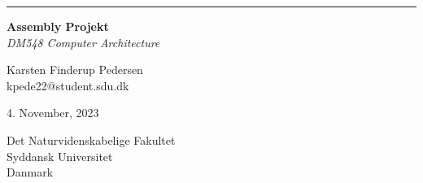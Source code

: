 \begin{titlepage}
  \raggedleft
	
	\rule{1pt}{\textheight} %
	\hspace{0.05\textwidth} %
	\parbox[b]{0.75\textwidth}{ %
    {\huge\bfseries Assembly Projekt}\\[2\baselineskip]
		{\large\textit{DM548 Computer Architecture}}
    
    \vspace{2cm}

    {\large Karsten Finderup Pedersen}\\
    {\small kpede22@student.sdu.dk}

    \vspace{1cm}

    4. November, 2023
    
		\vspace{0.35\textheight}
		
		Det Naturvidenskabelige Fakultet \\
    Syddansk Universitet \\
    Danmark

    \vspace{0.25cm}
	}
\end{titlepage}

